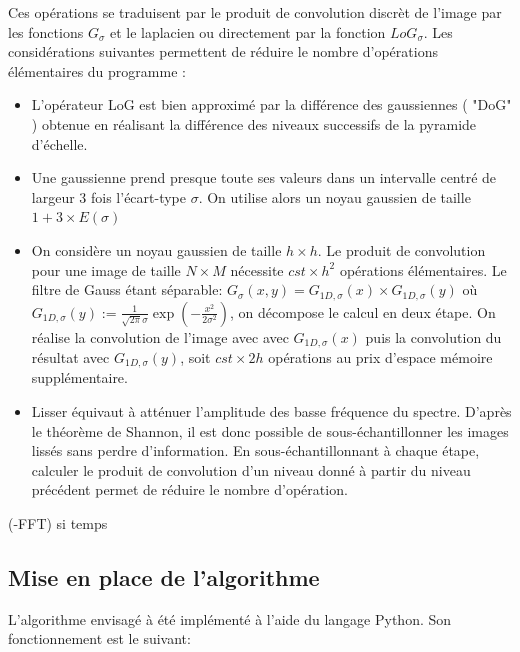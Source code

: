\documentclass{article}
\begin{document}
	Ces opérations se traduisent par le produit de convolution discrèt de l'image par les fonctions $G_{\sigma}$ et le laplacien ou directement par la fonction ${LoG}_{\sigma}$. Les considérations suivantes permettent de réduire le nombre d'opérations élémentaires du programme : 
	\begin{itemize}
		\item L'opérateur LoG est bien approximé par la différence des gaussiennes ( "DoG" ) obtenue en réalisant la différence des niveaux successifs de la pyramide d'échelle.
		\item Une gaussienne prend presque toute ses valeurs dans un intervalle centré de largeur 3 fois l'écart-type $\sigma$. On utilise alors un noyau gaussien de taille $1 + 3 \times E(\sigma)$
		\item On considère un noyau gaussien de taille $h \times h$. Le produit de convolution pour une image de taille $N \times M$ nécessite $cst \times h^{2}$ opérations élémentaires. Le filtre de Gauss étant séparable: $G_{\sigma}(x,y)=G_{1D, \sigma}(x) \times G_{1D, \sigma}(y)$ o\`{u} $G_{1D, \sigma}(y) := \frac{1}{\sqrt{2\pi}\sigma}\exp(-\frac{x^{2}}{2\sigma^{2}})$, on décompose le calcul en deux étape. On réalise la convolution de l'image avec avec $G_{1D, \sigma}(x)$ puis la convolution du résultat avec $G_{1D, \sigma}(y)$, soit $cst \times 2h$ opérations au prix d'espace mémoire supplémentaire.
		\item Lisser équivaut à atténuer l'amplitude des basse fréquence du spectre. D'après le théorème de Shannon, il est donc possible de sous-échantillonner les images lissés sans perdre d'information. En sous-échantillonnant à chaque étape, calculer le produit de convolution d'un niveau donné à partir du niveau précédent permet de réduire le nombre d'opération.
	\end{itemize}

		(-FFT) si temps

	\subsection{Mise en place de l'algorithme}

	L'algorithme envisagé à été implémenté à l'aide du langage Python. Son fonctionnement est le suivant:
\end{document}
